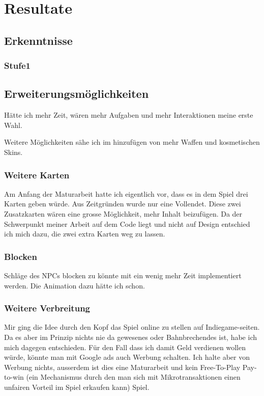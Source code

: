 \chapter{Resultate}

\section{Erkenntnisse}

\subsection{Stufe1}

\section{Erweiterungsmöglichkeiten}
Hätte ich mehr Zeit, wären mehr Aufgaben und mehr Interaktionen meine erste Wahl.

Weitere Möglichkeiten sähe ich im hinzufügen von mehr Waffen und kosmetischen Skins.

\subsection{Weitere Karten}
Am Anfang der Maturarbeit hatte ich eigentlich vor, dass es in dem Spiel drei Karten geben würde.
Aus Zeitgründen wurde nur eine Vollendet.
Diese zwei Zusatzkarten wären eine grosse Möglichkeit, mehr Inhalt beizufügen.
Da der Schwerpunkt meiner Arbeit auf dem Code liegt und nicht auf Design entschied ich mich dazu, die zwei extra Karten weg zu lassen.

\subsection{Blocken}
Schläge des NPCs blocken zu könnte mit ein wenig mehr Zeit implementiert werden.
Die Animation dazu hätte ich schon.
\subsection{Weitere Verbreitung}

Mir ging die Idee durch den Kopf das Spiel online zu stellen auf Indiegame-seiten.
Da es aber im Prinzip nichts nie da gewesenes oder Bahnbrechendes ist, habe ich mich dagegen entschieden.
Für den Fall dass ich damit Geld verdienen wollen würde, könnte man mit Google ads auch Werbung schalten.
Ich halte aber von Werbung nichts, ausserdem ist dies eine Maturarbeit und kein Free-To-Play Pay-to-win 
(ein Mechanismus durch den man sich mit Mikrotransaktionen einen unfairen Vorteil im Spiel erkaufen kann) 
Spiel.

